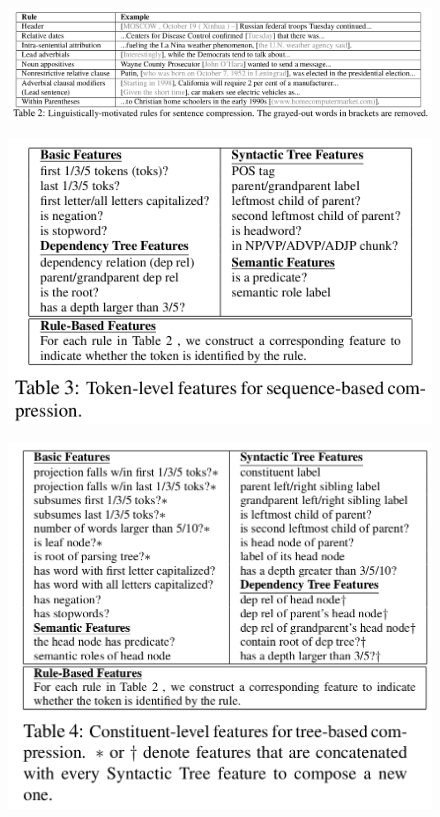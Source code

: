 \documentclass[xcolor={table}]{beamer}
\begin{document}
\begin{frame}{\cite{wang2013sentence}}
\begin{figure}[h]
\centering
\includegraphics[scale=.22]{images/table2-wang13} 
\end{figure}
\end{frame}

\begin{frame}{\cite{wang2013sentence}}
\begin{figure}[h]
\centering
\includegraphics[scale=.3]{images/table3-wang13} 
\end{figure}
\end{frame}

\begin{frame}{\cite{wang2013sentence}}
\begin{figure}[h]
\centering
\includegraphics[scale=.25]{images/table4-wang13} 
\end{figure}
\end{frame}
\end{document}

